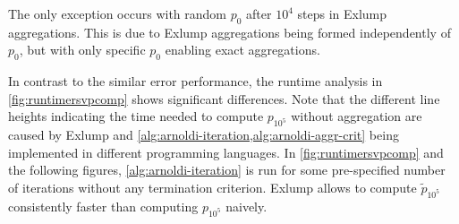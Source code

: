 \documentclass[runningheads]{llncs}
\begin{document}
The only exception occurs with random $p_0$ after $10^4$ steps in Exlump aggregations.
This is due to Exlump aggregations being formed independently of $p_0$, but with only specific $p_0$ enabling exact aggregations.

\afterpage{\clearpage}

In contrast to the similar error performance, the runtime analysis in \cref{fig:runtimersvpcomp} shows significant differences.
Note that the different line heights indicating the time needed to compute $p_{10^5}$ without aggregation are caused by Exlump and \cref{alg:arnoldi-iteration,alg:arnoldi-aggr-crit} being implemented in different programming languages.
In \cref{fig:runtimersvpcomp} and the following figures, \cref{alg:arnoldi-iteration} is run for some pre-specified number of iterations without any termination criterion.
Exlump allows to compute $\tilde{p}_{10^5}$ consistently faster than computing $p_{10^5}$ naively.
\end{document}
